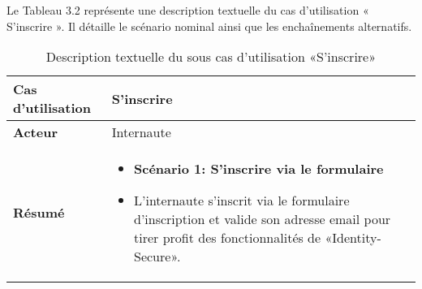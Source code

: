 Le Tableau 3.2 représente une description textuelle du cas d'utilisation « S'inscrire ». Il détaille le scénario nominal ainsi que les enchaînements alternatifs.
\begin{longtable}{|>{\arraybackslash}p{4.2cm}|>{\arraybackslash}p{12.5cm}|}
\caption{\centering Description textuelle du sous cas d'utilisation «S'inscrire»}
\label{tab:backlog:ch2:inscription} \\
\hline
\rowcolor{gray!20}
\textbf{Cas d'utilisation} & S'inscrire \\
\hline
\textbf{Acteur} & Internaute \\
\hline
\textbf{Résumé} &
\begin{itemize}[label=]
    \item \textbf{Scénario 1: S'inscrire via le formulaire}
    \item L'internaute s'inscrit via le formulaire d'inscription et valide son adresse email pour tirer profit des fonctionnalités de «Identity-Secure».


\end{itemize}
\end{longtable}
